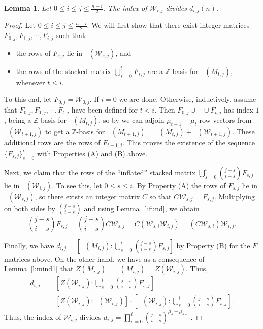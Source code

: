 \documentclass[11pt]{article}
\newtheorem{lemma}[theo]{Lemma}
\theoremstyle{definition}
\numberwithin{equation}{section}
\numberwithin{equation}{section}
\newcommand{\Z}[0]{\mathbb{Z}}
\DeclareMathOperator{\rowz}{row_{\mathbb{Z}}}
\newcommand{\W}{\mathcal{W}}
\begin{document}
\begin{lemma}\label{thm:index}
Let $0 \leq i \leq j \leq \frac{n-i}{2}$.  The index of $\W_{i,j}$ divides $d_{i,j}(n)$.
\end{lemma}
\begin{proof}
Let $0 \leq i \leq j \leq \frac{n-i}{2}$.  We will first show that there exist integer matrices $F_{0,j}, F_{1,j}, \cdots , F_{i,j}$ such that:
\begin{itemize}
    \item[(A)] the rows of $F_{s,j}$ lie in $\rowz(\W_{s,j})$, and
    \item[(B)] the rows of the stacked matrix $\bigcup_{s=0}^t F_{s,j}$ are a $\Z$-basis for $\rowz(M_{t,j})$, whenever $t \leq i$.
\end{itemize}
To this end, let $F_{0,j} = \W_{0,j}$.  If $i=0$ we are done.  Otherwise, inductively, assume that $F_{0,j}, F_{1,j}, \cdots , F_{t, j}$ have been defined for $t < i$.  Then $F_{0,j} \cup \cdots \cup F_{t,j}$ has index $1$, being a $\Z$-basis for $\rowz(M_{t,j})$, so by \cite[Proposition 2]{wilson_classic} we can adjoin $\mu_{t+1}-\mu_{t}$ row vectors from $\rowz(\W_{t+1,j})$ to get a $\Z$-basis for $\rowz(M_{t+1,j}) = \rowz(M_{t,j}) + \rowz(\W_{t+1,j})$.  These additional rows are the rows of $F_{t+1,j}$.  This proves the existence of the sequence $\{F_{s,j}\}_{s=0}^{i}$ with Properties (A) and (B) above.

Next, we claim that the rows of the ``inflated'' stacked matrix $\bigcup_{s=0}^{i}\binom{j-s}{i-s} F_{s,j}$ lie in $\rowz(\W_{i,j})$.  To see this, let $0 \leq s \leq i$.  By Property (A) the rows of $F_{s,j}$ lie in $\rowz(\W_{s,j})$, so there exists an integer matrix $C$ so that $C \W_{s,j} = F_{s,j}$.  Multiplying on both sides by $\binom{j-s}{i-s}$ and using Lemma~\ref{l:fund}, we obtain
\[ \binom{j-s}{i-s} F_{s,j} = \binom{j-s}{i-s} C \W_{s,j} = C (\W_{s,i} \W_{i,j}) = \left(C \W_{s,i}\right) \W_{i,j}. \]

Finally, we have $d_{i,j} = [\rowz(M_{i,j}): \bigcup_{s=0}^{i}\binom{j-s}{i-s} F_{s,j}]$ by Property (B) for the $F$ matrices above.
On the other hand, we have as a consequence of Lemma~\ref{l:mind1} that $Z(M_{i,j}) = \rowz(M_{i,j}) = Z(\W_{i,j})$.  Thus, 
\begin{align*} 
d_{i,j} &= [Z(\W_{i,j}) : \bigcup_{s=0}^{i}\binom{j-s}{i-s} F_{s,j}]\\ 
&= [Z(\W_{i,j}) :   \rowz(\W_{i,j}) ]   \cdot  [\rowz(\W_{i,j}) :  \bigcup_{s=0}^{i}\binom{j-s}{i-s} F_{s,j}].
\end{align*}
Thus, the index of $\W_{i,j}$ divides $d_{i,j} = \prod_{s=0}^{i} \binom{j-s}{i-s}^{\mu_{s} - \mu_{s-1}}$.
\end{proof}
\end{document}
